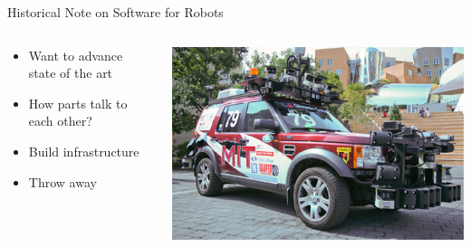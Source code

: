 \documentclass[aspectratio=43]{beamer}
\begin{document}
\begin{frame}{Historical Note on Software for Robots}
\begin{columns}
	\begin{column}{0.55\textwidth}
		\begin{itemize}
			\item Want to advance state of the art
                        \item How parts talk to each other?
                        \item Build infrastructure
			\item Throw away 
		\end{itemize} 
        \end{column} 
        \begin{column}{0.45\textwidth} 
          \centering 
          \includegraphics[width=\textwidth]{fig/urbanchallenge1.jpg} 
        \end{column}
\end{columns}

\end{frame}
\end{document}
